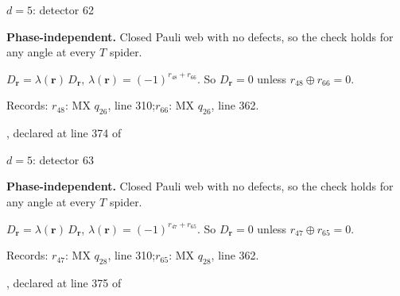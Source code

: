 \label{d5_det062}
{\Large $d=5$: detector 62}\par
\textbf{Phase-independent.} Closed Pauli web with no defects, so the check holds for any angle at every $T$ spider.
\begin{center}
\end{center}
\vspace{-1mm}
$D_{\boldsymbol r}=\lambda(\boldsymbol r)\,D_{\boldsymbol r}$, \quad $\lambda(\boldsymbol r)=(-1)^{r_{48}+r_{66}}$. \qquad So $D_{\boldsymbol r}=0$ unless $r_{48}\oplus r_{66}=0$.
\par\smallskip\begin{minipage}{.98\linewidth}\small Records: $r_{48}$: MX $q_{26}$, line 310;\quad $r_{66}$: MX $q_{26}$, line 362.\end{minipage}
\vfill
{\footnotesize\texttt{}, declared at line 374 of \texttt{}}
\newpage

\label{d5_det063}
{\Large $d=5$: detector 63}\par
\textbf{Phase-independent.} Closed Pauli web with no defects, so the check holds for any angle at every $T$ spider.
\begin{center}
\end{center}
\vspace{-1mm}
$D_{\boldsymbol r}=\lambda(\boldsymbol r)\,D_{\boldsymbol r}$, \quad $\lambda(\boldsymbol r)=(-1)^{r_{47}+r_{65}}$. \qquad So $D_{\boldsymbol r}=0$ unless $r_{47}\oplus r_{65}=0$.
\par\smallskip\begin{minipage}{.98\linewidth}\small Records: $r_{47}$: MX $q_{28}$, line 310;\quad $r_{65}$: MX $q_{28}$, line 362.\end{minipage}
\vfill
{\footnotesize\texttt{}, declared at line 375 of \texttt{}}
\newpage

